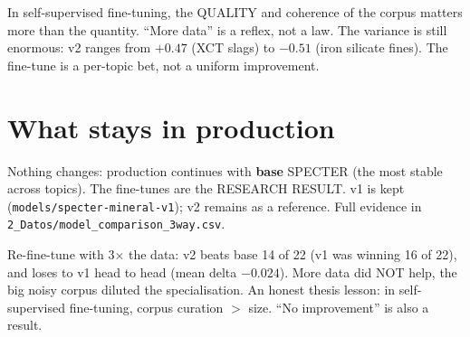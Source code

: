 \documentclass[11pt,a4paper]{article}
\begin{document}
\begin{ojo}
In self-supervised fine-tuning, the QUALITY and coherence of the corpus matters more than the
quantity. ``More data'' is a reflex, not a law. The variance is still enormous: v2 ranges from
$+0.47$ (XCT slags) to $-0.51$ (iron silicate fines). The fine-tune is a per-topic bet, not a
uniform improvement.
\end{ojo}

\section{What stays in production}

Nothing changes: production continues with \textbf{base} SPECTER (the most stable across
topics). The fine-tunes are the RESEARCH RESULT. v1 is kept
(\texttt{models/specter-mineral-v1}); v2 remains as a reference. Full evidence in
\texttt{2\_Datos/model\_comparison\_3way.csv}.

\begin{resumen}
Re-fine-tune with 3$\times$ the data: v2 beats base 14 of 22 (v1 was winning 16 of 22), and
loses to v1 head to head (mean delta $-0.024$). More data did NOT help, the big noisy corpus
diluted the specialisation. An honest thesis lesson: in self-supervised fine-tuning, corpus
curation $>$ size. ``No improvement'' is also a result.
\end{resumen}
\end{document}
